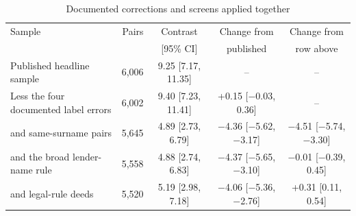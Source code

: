 \begin{table}[htbp]\centering\caption{Documented corrections and screens applied together}\label{tab:jointscreens}
\footnotesize\setlength{\tabcolsep}{2.5pt}\begin{tabular}{lrccc}\toprule
Sample & Pairs & Contrast & Change from & Change from \\
 & & [95\% CI] & published & row above \\\midrule
Published headline sample & 6,006 & 9.25 [7.17, 11.35] & -- & -- \\
Less the four documented label errors & 6,002 & 9.40 [7.23, 11.41] & +0.15 [$-$0.03, 0.36] & -- \\
\quad and same-surname pairs & 5,645 & 4.89 [2.73, 6.79] & $-$4.36 [$-$5.62, $-$3.17] & $-$4.51 [$-$5.74, $-$3.30] \\
\quad and the broad lender-name rule & 5,558 & 4.88 [2.74, 6.83] & $-$4.37 [$-$5.65, $-$3.10] & $-$0.01 [$-$0.39, 0.45] \\
\quad and legal-rule deeds & 5,520 & 5.19 [2.98, 7.18] & $-$4.06 [$-$5.36, $-$2.76] & +0.31 [0.11, 0.54] \\
\bottomrule\end{tabular}
\end{table}
